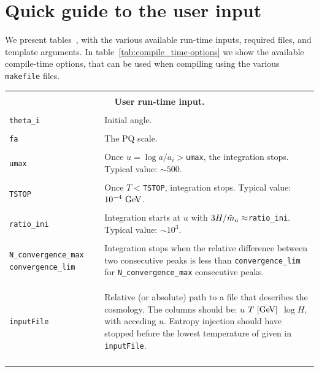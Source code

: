 \documentclass[11pt,a4paper]{article}
\begin{document}
\section{Quick guide to the user input}\label{app:usr_input}
\setcounter{equation}{0}
We present tables~, with the various available run-time inputs, required files, and template arguments. In table~\ref{tab:compile_time-options} we show the available compile-time options, that can be used when compiling using the various {\tt makefile} files. 
%
\begin{table}[h!]
	\centering
	\begin{tabular}{l l}
		\hline\\[-0.4cm]
		\multicolumn{2}{c}{\bf User run-time input.}  \\
		\hline\\[-0.4cm]

		{\tt theta\_i} & Initial angle.  \\
		\hline\\[-0.4cm]

		{\tt fa} & The PQ scale.\\
		\hline\\[-0.4cm]

		{\tt umax } & Once $u=\log a/a_i>${\tt umax}, the integration stops. Typical value: $\sim 500$.\\
		\hline\\[-0.4cm]

		{\tt TSTOP} & Once $T<${\tt TSTOP}, integration stops. Typical value: $10^{-4}~{\rm GeV}$.\\
		\hline\\[-0.4cm]

 		{\tt ratio\_ini}& Integration starts at $u$ with $3H/\tilde m_{a}{} \approx${\tt ratio\_ini}. Typical value: $\sim 10^{3}$.\\
		\hline\\[-0.4cm]

		\multirow{1}{4cm}{{\tt N\_convergence\_max} {\tt convergence\_lim}} & \multirow{1}{12cm}{Integration stops when  the relative difference 
		between two consecutive peaks  is less than {\tt convergence\_lim} for {\tt N\_convergence\_max} 
		consecutive peaks. } \\ \\ \\ 
		\hline\\[-0.4cm]

		{\tt inputFile} & \multirow{1}{12cm}{Relative (or absolute) path to a file that describes the cosmology. The columns should be: $u$ $T ~[{\rm GeV}]$ $\log H$, with acceding $u$. Entropy injection should have stopped before the lowest temperature of given in {\tt inputFile}.} \\ \\  \\ \\
		\hline\\[-0.4cm]


\end{tabular}
\end{table}
\end{document}
